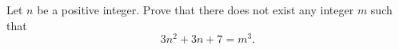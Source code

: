 \documentclass[varwidth]{standalone}
\begin{document}
    Let $n$ be a positive integer. Prove that there does not exist any integer $m$ such that
    \[
        3n^2 + 3n + 7 = m^3.
    \]
\end{document}
